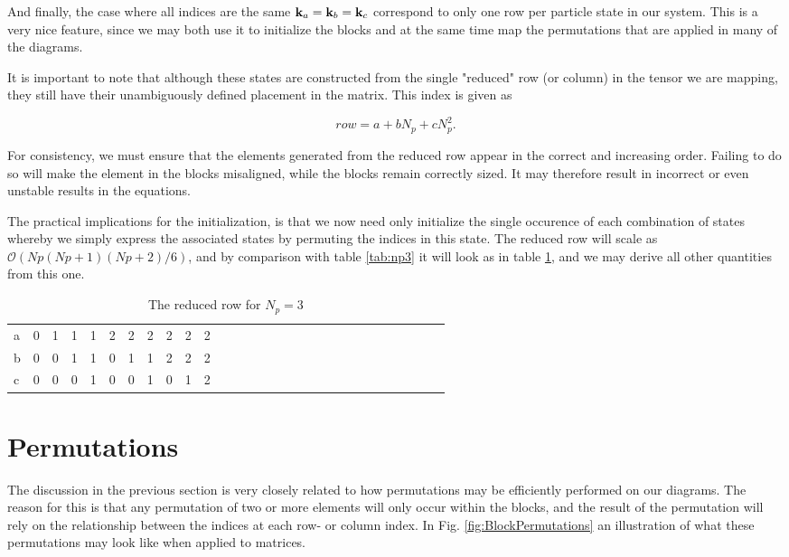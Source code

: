 And finally, the case where all indices are the same $\bold{k}_a = \bold{k}_b = \bold{k}_c$ correspond to only one row per particle state in our system. This is a very nice feature, since we may both use it to initialize the blocks and at the same time map the permutations that are applied in many of the diagrams. 

It is important to note that although these states are constructed from the single "reduced" row (or column) in the tensor we are mapping, they still have their unambiguously defined placement in the matrix. This index is given as 

\begin{equation}
row = a + bN_p + cN_p^2.
\end{equation}

For consistency, we must ensure that the elements generated from the reduced row appear in the correct and increasing order. Failing to do so will make the element in the blocks misaligned, while the blocks remain correctly sized. It may therefore result in incorrect or even unstable results in the equations.


The practical implications for the initialization, is that we now need only initialize the single occurence of each combination of states whereby we simply express the associated states by permuting the indices in this state. The reduced row will scale as $\mathcal{O}(Np(Np+1)(Np+2)/6)$, and by comparison with table \ref{tab:np3} it will look as in table \ref{tab:np32}, and we may derive all other quantities from this one.

\begin{table}[]
\centering
\caption{The reduced row for $N_p = 3$ }
\label{tab:np32}
\begin{tabular}{lllllllllllllllllllllllllllll}
a & 0&  1&  1&  1&  2&  2&  2&  2&  2&  2& \\
b & 0&  0&  1&  1&  0&  1&  1&  2&  2&  2& \\
c & 0&  0&  0&  1&  0&  0&  1&  0&  1&  2& \\
\end{tabular}
\end{table}

\section{Permutations}

The discussion in the previous section is very closely related to how
permutations may be efficiently performed on our diagrams. The reason
for this is that any permutation of two or more elements will only
occur within the blocks, and the result of the permutation will rely
on the relationship between the indices at each row- or column
index. In Fig. \ref{fig:BlockPermutations} an illustration of what
these  permutations may look like when applied to matrices.

